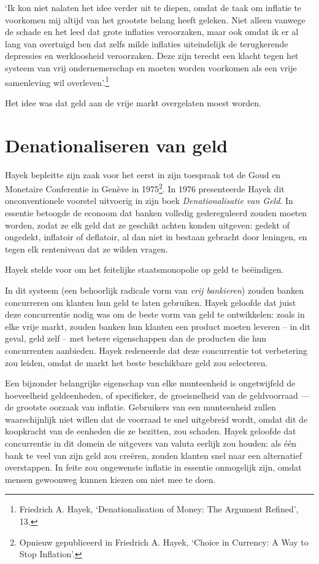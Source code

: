 \documentclass[
  a5paper,
  smalldemyvopaper,11pt,twoside,onecolumn,openright,extrafontsizes]{memoir}
\begin{document}
`Ik kon niet nalaten het idee verder uit te diepen, omdat de taak om
inflatie te voorkomen mij altijd van het grootste belang heeft geleken.
Niet alleen vanwege de schade en het leed dat grote inflaties
veroorzaken, maar ook omdat ik er al lang van overtuigd ben dat zelfs
milde inflaties uiteindelijk de terugkerende depressies en werkloosheid
veroorzaken. Deze zijn terecht een klacht tegen het systeem van vrij
ondernemerschap en moeten worden voorkomen als een vrije samenleving wil
overleven'.\footnote{\hspace{0pt}Friedrich A. Hayek, `Denationalisation
  of Money: The Argument Refined', 13.}

Het idee was dat geld aan de vrije markt overgelaten moest worden.

\section{Denationaliseren van geld}\label{denationaliseren-van-geld}

Hayek bepleitte zijn zaak voor het eerst in zijn toespraak tot de Goud
en Monetaire Conferentie in Genève in 1975\footnote{Opnieuw gepubliceerd
  in Friedrich A. Hayek, `Choice in Currency: A Way to Stop Inflation'.}.
In 1976 presenteerde Hayek dit onconventionele voorstel uitvoerig in
zijn boek \emph{Denationalisatie van Geld}. In essentie betoogde de
econoom dat banken volledig gedereguleerd zouden moeten worden, zodat ze
elk geld dat ze geschikt achten konden uitgeven: gedekt of ongedekt,
inflatoir of deflatoir, al dan niet in bestaan gebracht door leningen,
en tegen elk renteniveau dat ze wilden vragen.

Hayek stelde voor om het feitelijke staatsmonopolie op geld te
beëindigen.

In dit systeem (een behoorlijk radicale vorm van \emph{vrij bankieren})
zouden banken concurreren om klanten hun geld te laten gebruiken. Hayek
geloofde dat juist deze concurrentie nodig was om de beste vorm van geld
te ontwikkelen: zoals in elke vrije markt, zouden banken hun klanten een
product moeten leveren -- in dit geval, geld zelf -- met betere
eigenschappen dan de producten die hun concurrenten aanbieden. Hayek
redeneerde dat deze concurrentie tot verbetering zou leiden, omdat de
markt het beste beschikbare geld zou selecteren.

Een bijzonder belangrijke eigenschap van elke munteenheid is
ongetwijfeld de hoeveelheid geldeenheden, of specifieker, de
groeisnelheid van de geldvoorraad --- de grootste oorzaak van inflatie.
Gebruikers van een munteenheid zullen waarschijnlijk niet willen dat de
voorraad te snel uitgebreid wordt, omdat dit de koopkracht van de
eenheden die ze bezitten, zou schaden. Hayek geloofde dat concurrentie
in dit domein de uitgevers van valuta eerlijk zou houden: als één bank
te veel van zijn geld zou creëren, zouden klanten snel naar een
alternatief overstappen. In feite zou ongewenste inflatie in essentie
onmogelijk zijn, omdat mensen gewoonweg kunnen kiezen om niet mee te
doen.
\end{document}
